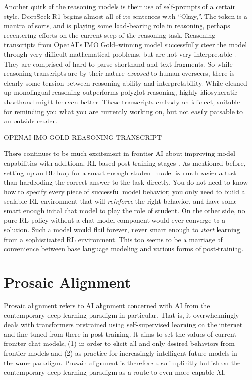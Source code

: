 Another quirk of the reasoning models is their use of self-prompts of a certain
style. DeepSeek-R1 begins almost all of its sentences with ``Okay,''. The token
is a mantra of sorts, and is playing some load-bearing role in reasoning,
perhaps recentering efforts on the current step of the reasoning task.
Reasoning transcripts from OpenAI's IMO Gold--winning model successfully steer
the model through very difficult mathematical problems, but are not very
interpretable \cite{}. They are comprised of hard-to-parse shorthand and text
fragments. So while reasoning transcripts are by their nature \emph{exposed} to
human overseers, there is clearly some tension between reasoning ability and
interpretability. While cleaned up monolingual reasoning outperforms polyglot
reasoning, highly idiosyncratic shorthand might be even better. These
transcripts embody an idiolect, suitable for reminding you what you are
currently working on, but not easily parsable to an outside reader.

OPENAI IMO GOLD REASONING TRANSCRIPT

There continues to be much excitement in frontier AI about improving model
capabilities with additional RL-based post-training stages
\cite{silver2025experience}. As mentioned before, setting up an RL loop for a
smart enough student model is much easier a task than hardcoding the correct
answer to the task directly. You do not need to know how to specify every piece
of successful model behavior; you only need to build a scalable RL environment
that will \emph{reinforce} the right behavior, and have some smart enough
inital chat model to play the role of student. On the other side, no pure RL
policy without a chat model component would ever converge to a solution. Such a
model would flail forever, never smart enough to \emph{start} learning from a
sophisticated RL environment. This too seems to be a marriage of convenience
between base language modeling and various forms of post-training.

\section{Prosaic Alignment}
Prosaic alignment refers to AI alignment concerned with AI from the
contemporary deep learning paradigm in particular. That is, it overwhelmingly
deals with transformers pretrained using self-supervised learning on the
internet and fine-tuned from there in post-training. It aims to set the values
of current froniter chat models, (1) in order to elicit all and only desired
behaviors from frontier models and (2) as practice for increasingly intelligent
future models in the same paradigm. Prosaic alignment is therefore also
implicitly bullish on the contemporary deep learning paradigm as a route to
even more capable AI.

